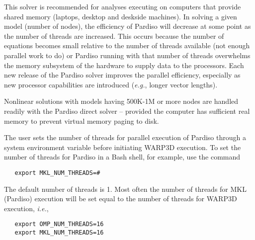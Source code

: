 \documentclass[11pt]{report}
\numberwithin{equation}{section}
\newcommand{\nin} {\noindent}
\newcommand{\eg}{\emph{e.g.},\xspace}
\newcommand{\ie}{\emph{i.e.},\xspace}
\begin{document}
This solver is recommended for analyses executing on computers that
provide shared memory (laptops, desktop and deskside machines).  In solving
a given model (number of nodes), the efficiency of Pardiso will
decrease at some point as the number of threads are increased. This occurs
because the number of equations becomes small relative to the number of
threads available (not enough parallel work to do)  or Pardiso 
running with that number of threads 
overwhelms the memory subsystem of the hardware to supply data to the
processors. Each new release of the Pardiso solver improves the
parallel efficiency, especially as new processor capabilities are introduced
(\eg longer vector lengths).

Nonlinear solutions with models having 500K-1M or more nodes are handled readily with the
Pardiso direct solver -- provided the computer has sufficient real memory to prevent
virtual memory paging to disk. 

The user sets the number of threads for parallel execution of Pardiso through  a 
system environment variable before initiating WARP3D execution. To set the 
number of threads for Pardiso in a Bash shell, for example,  use the  command 
\small
\begin{verbatim}
   export MKL_NUM_THREADS=#
\end{verbatim}
\normalsize
\nin  The default number 
of threads is 1. Most often the number of threads for MKL (Pardiso)
execution will be set  equal to the number of threads 
for WARP3D execution, \ie
\small
\begin{verbatim}
   export OMP_NUM_THREADS=16
   export MKL_NUM_THREADS=16
\end{verbatim}
\normalsize
\end{document}
